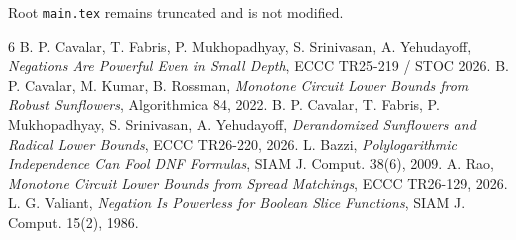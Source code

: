 \documentclass[11pt]{article}
\begin{document}
Root \texttt{main.tex} remains truncated and is not modified.

\begin{thebibliography}{6}
 B. P. Cavalar, T. Fabris, P. Mukhopadhyay, S. Srinivasan, A. Yehudayoff, \emph{Negations Are Powerful Even in Small Depth}, ECCC TR25-219 / STOC 2026.
 B. P. Cavalar, M. Kumar, B. Rossman, \emph{Monotone Circuit Lower Bounds from Robust Sunflowers}, Algorithmica 84, 2022.
 B. P. Cavalar, T. Fabris, P. Mukhopadhyay, S. Srinivasan, A. Yehudayoff, \emph{Derandomized Sunflowers and Radical Lower Bounds}, ECCC TR26-220, 2026.
 L. Bazzi, \emph{Polylogarithmic Independence Can Fool DNF Formulas}, SIAM J. Comput. 38(6), 2009.
 A. Rao, \emph{Monotone Circuit Lower Bounds from Spread Matchings}, ECCC TR26-129, 2026.
 L. G. Valiant, \emph{Negation Is Powerless for Boolean Slice Functions}, SIAM J. Comput. 15(2), 1986.
\end{thebibliography}
\end{document}
